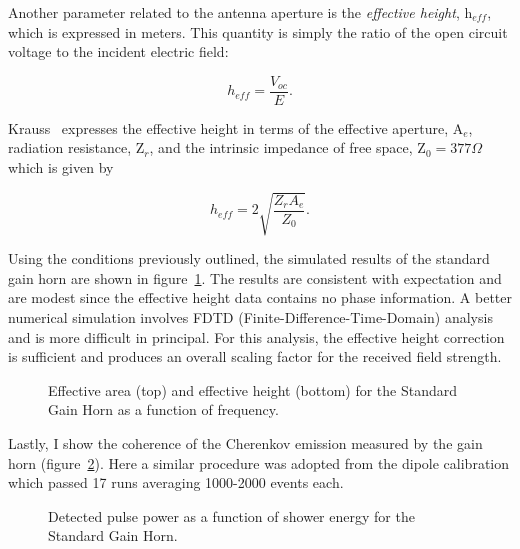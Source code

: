 \par Another parameter related to the antenna aperture is the \emph{effective height}, h$_{eff}$, which is expressed in meters.  This quantity is simply the ratio of the open circuit voltage to the incident electric field:

\begin{equation}
\label{eq:heff}
h_{eff} = \frac{V_{oc}}{E}.
\end{equation}

\noindent Krauss~\cite{Kraus.1988} expresses the effective height in terms of the effective aperture, A$_{e}$, radiation resistance, Z$_r$, and the intrinsic impedance of free space, Z$_0 = 377 \Omega$ which is given by

\begin{equation}
h_{eff} = 2\sqrt{\frac{Z_{r}A_{e}}{Z_0}}.
\end{equation}

\noindent Using the conditions previously outlined, the simulated results of the standard gain horn are shown in figure~\ref{fig:effHandArea}.  The results are consistent with expectation and are modest since the effective height data contains no phase information.  A better numerical simulation involves FDTD (Finite-Difference-Time-Domain) analysis~\cite{Marrocco.2005} and is more difficult in principal.  For this analysis, the effective height correction is sufficient and produces an overall scaling factor for the received field strength.

\begin{figure}[htbp]
\centering
\epsfxsize=4.5in
\caption{Effective area (top) and effective height (bottom) for the Standard Gain Horn as a function of frequency.}
\label{fig:effHandArea}
\end{figure}

\par Lastly, I show the coherence of the Cherenkov emission measured by the gain horn (figure~\ref{fig:hornCoh}).  Here a similar procedure was adopted from the dipole calibration which passed 17 runs averaging 1000-2000 events each.

\begin{figure}[htbp]
\centering
\epsfxsize=4.5in
\caption{Detected pulse power as a function of shower energy for the Standard Gain Horn.}
\label{fig:hornCoh}
\end{figure}